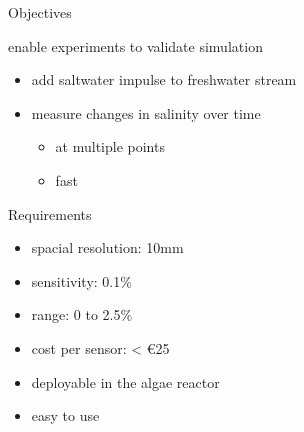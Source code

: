 \documentclass[24pt,ignorenonframetext,]{beamer}
\newcommand{\euro}{€}
\providecommand{\tightlist}{%
  \setlength{\itemsep}{0pt}\setlength{\parskip}{0pt}}
\begin{document}
\begin{frame}{Objectives}

enable experiments to validate simulation

\begin{itemize}
\tightlist
\item
  add saltwater impulse to freshwater stream
\item
  measure changes in salinity over time

  \begin{itemize}
  \tightlist
  \item
    at multiple points
  \item
    fast
  \end{itemize}
\end{itemize}

\end{frame}

\begin{frame}

\begin{block}{Requirements}

\begin{itemize}
\tightlist
\item
  spacial resolution: 10mm
\item
  sensitivity: 0.1\%
\item
  range: 0 to 2.5\%
\item
  cost per sensor: \textless{} \euro{}25
\item
  deployable in the algae reactor
\item
  easy to use
\end{itemize}

\end{block}

\end{frame}
\end{document}
